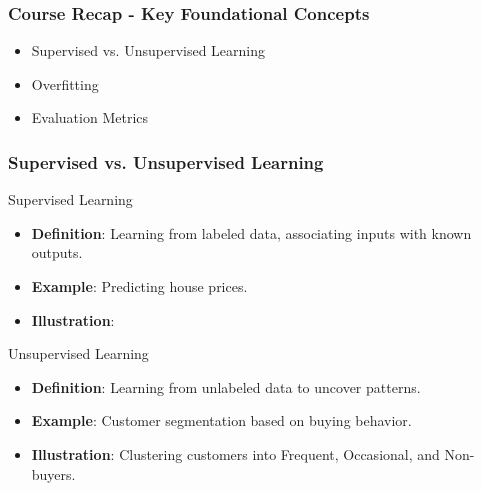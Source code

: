 \documentclass[aspectratio=169]{beamer}
\begin{document}
\begin{frame}[fragile]
    \frametitle{Course Recap - Key Foundational Concepts}
    \begin{itemize}
        \item Supervised vs. Unsupervised Learning
        \item Overfitting
        \item Evaluation Metrics
    \end{itemize}
\end{frame}

\begin{frame}[fragile]
    \frametitle{Supervised vs. Unsupervised Learning}
    \begin{block}{Supervised Learning}
        \begin{itemize}
            \item \textbf{Definition}: Learning from labeled data, associating inputs with known outputs.
            \item \textbf{Example}: Predicting house prices.
            \item \textbf{Illustration}: 
              \begin{center}
              \end{center}
        \end{itemize}
    \end{block}
    
    \begin{block}{Unsupervised Learning}
        \begin{itemize}
            \item \textbf{Definition}: Learning from unlabeled data to uncover patterns.
            \item \textbf{Example}: Customer segmentation based on buying behavior.
            \item \textbf{Illustration}: Clustering customers into Frequent, Occasional, and Non-buyers.
        \end{itemize}
    \end{block}
\end{frame}
\end{document}
